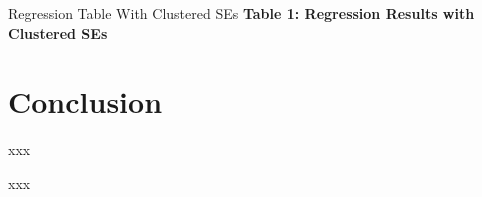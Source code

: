 \documentclass[10pt,t,aspectratio=169]{beamer}
\begin{document}
\begin{frame}{Regression Table With Clustered SEs}
  \centering
  \textbf{Table 1: Regression Results with Clustered SEs}
  \vspace{0.3cm}
  \resizebox{\textwidth}{!}{}
\end{frame}


\section{Conclusion}

\begin{frame}{xxx}

    xxx
  
\end{frame}
\end{document}
